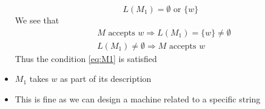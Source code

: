 \begin{frame}[allowframebreaks]
\begin{itemize}
   \begin{equation*}
     L(M_1) = \emptyset \text{ or } \{w\}
   \end{equation*}
   We see that
   \begin{equation*}
     \begin{split}
     &  M \text{ accepts } w \Rightarrow L(M_1) = \{w\} \neq \emptyset\\
     &  L(M_1) \neq \emptyset \Rightarrow M \text{ accepts } w
     \end{split}
   \end{equation*}
 Thus the condition \eqref{eq:M1} is satisfied
 \item $M_1$ takes $w$ as part of its description
 \item This is fine as we can design a machine related to a
   specific string
\end{itemize}
\end{frame}


